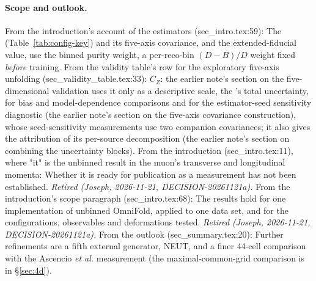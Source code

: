 \paragraph{Scope and outlook.} From the introduction's account of the estimators (sec\_intro.tex:59): The \resFiveAxis{} (Table~\ref{tab:config-key}) and its five-axis covariance, and the extended-fiducial value, use the binned purity weight, a per-reco-bin $(D-B)/D$ weight fixed \emph{before} training. From the validity table's row for the exploratory five-axis unfolding (sec\_validity\_table.tex:33): $C_Z$: the earlier note's section on the five-dimensional validation uses it only as a descriptive scale, the \estPurity{}'s total uncertainty, for bias and model-dependence comparisons and for the estimator-seed sensitivity diagnostic (the earlier note's section on the five-axis covariance construction), whose seed-sensitivity measurements use two companion covariances; it also gives the attribution of its per-source decomposition (the earlier note's section on combining the uncertainty blocks). From the introduction (sec\_intro.tex:11), where "it" is the unbinned result in the muon's transverse and longitudinal momenta: Whether it is ready for publication as a measurement has not been established. \emph{Retired (Joseph, 2026-11-21, DECISION-20261121a).} From the introduction's scope paragraph (sec\_intro.tex:68): The results hold for one implementation of unbinned OmniFold, applied to one data set, and for the configurations, observables and deformations tested. \emph{Retired (Joseph, 2026-11-21, DECISION-20261121a).} From the outlook (sec\_summary.tex:20): Further refinements are a fifth external generator, NEUT, and a finer 44-cell comparison with the Ascencio \emph{et al.} measurement (the maximal-common-grid comparison is in \S\ref{sec:4d}).
